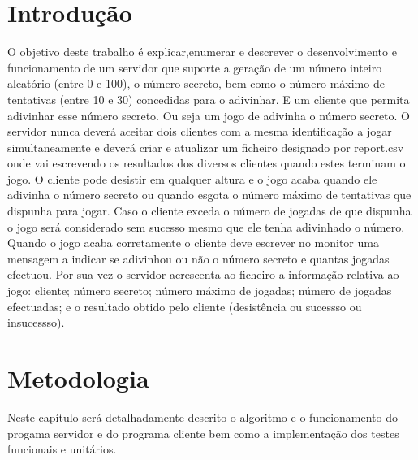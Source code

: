\documentclass{report}
\begin{document}
\tableofcontents


\clearpage
{}

\chapter{Introdução}
\label{chap.introducao}
O objetivo deste trabalho é explicar,enumerar e descrever o desenvolvimento e funcionamento de um servidor que suporte a geração de um número inteiro aleatório (entre 0 e 100), o número secreto, bem como o número máximo de tentativas (entre 10 e 30) concedidas para o adivinhar. E um cliente que permita adivinhar esse número secreto. Ou seja um jogo de adivinha o número secreto.
O servidor nunca deverá aceitar dois clientes com a mesma identificação a jogar simultaneamente e deverá criar e atualizar um ficheiro designado por report.csv onde vai escrevendo os resultados dos diversos clientes quando estes terminam o jogo. O cliente pode desistir em qualquer altura e o jogo acaba quando ele adivinha o número secreto ou quando esgota o número máximo de tentativas que dispunha para jogar. Caso o cliente exceda o número de jogadas de que dispunha o jogo será considerado sem sucesso mesmo que ele tenha adivinhado o número. Quando o jogo acaba corretamente o cliente deve escrever no monitor uma mensagem a indicar se adivinhou ou não o número secreto e quantas jogadas efectuou. Por sua vez o servidor acrescenta ao ficheiro a informação relativa ao jogo: cliente; número secreto; número máximo de jogadas; número de jogadas efectuadas; e o resultado obtido pelo cliente (desistência ou sucessso ou insucessso).

\chapter{Metodologia}
\label{chap.metodologia}
Neste capítulo será detalhadamente descrito o algoritmo e o funcionamento do progama servidor e do programa cliente bem como a implementação dos testes funcionais e unitários.
\end{document}
